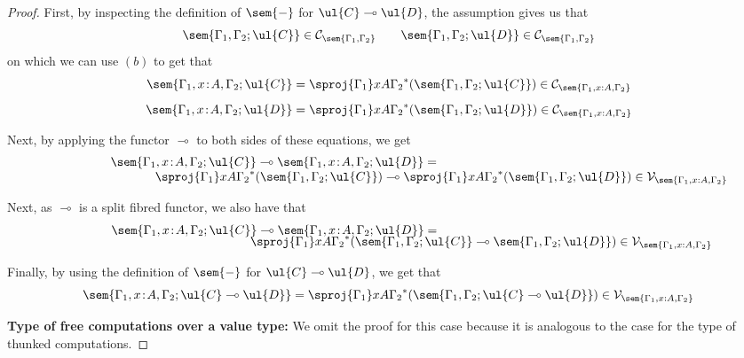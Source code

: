 \begin{proof}
First, by inspecting the definition of $\sem{-}$ for $\ul{C} \multimap \ul{D}$, the assumption gives us that
\[
\sem{\Gamma_1,\Gamma_2;\ul{C}} \in \mathcal{C}_{\sem{\Gamma_1,\Gamma_2}}
\qquad
\sem{\Gamma_1,\Gamma_2;\ul{D}} \in \mathcal{C}_{\sem{\Gamma_1,\Gamma_2}}
\]
on which we can use $(b)$ to get that
\[
\begin{array}{c}
\sem{\Gamma_1, x \!:\! A, \Gamma_2; \ul{C}} = \sproj {\Gamma_1} x A {\Gamma_2}^*(\sem{\Gamma_1,\Gamma_2;\ul{C}}) \in \mathcal{C}_{\sem{\Gamma_1, x : A,\Gamma_2}}
\\[3mm]
\sem{\Gamma_1, x \!:\! A, \Gamma_2; \ul{D}} = \sproj {\Gamma_1} x A {\Gamma_2}^*(\sem{\Gamma_1,\Gamma_2;\ul{D}}) \in \mathcal{C}_{\sem{\Gamma_1, x : A,\Gamma_2}}
\end{array}
\]

Next, by applying the functor $\multimap$ to both sides of these equations, we get 
\[
\begin{array}{c}
\hspace{-6.5cm}
\sem{\Gamma_1, x \!:\! A, \Gamma_2; \ul{C}} \multimap \sem{\Gamma_1, x \!:\! A, \Gamma_2; \ul{D}} = 
\\
\hspace{3cm}
\sproj {\Gamma_1} x A {\Gamma_2}^*(\sem{\Gamma_1,\Gamma_2;\ul{C}}) \multimap \sproj {\Gamma_1} x A {\Gamma_2}^*(\sem{\Gamma_1,\Gamma_2;\ul{D}}) \in \mathcal{V}_{\sem{\Gamma_1, x : A,\Gamma_2}}
\end{array}
\]

Next, as $\multimap$ is a split fibred functor, we also have that
\[
\begin{array}{c}
\hspace{-6.5cm}
\sem{\Gamma_1, x \!:\! A, \Gamma_2; \ul{C}} \multimap \sem{\Gamma_1, x \!:\! A, \Gamma_2; \ul{D}} = 
\\[-1mm]
\hspace{5.25cm}
\sproj {\Gamma_1} x A {\Gamma_2}^*(\sem{\Gamma_1,\Gamma_2;\ul{C}} \multimap \sem{\Gamma_1,\Gamma_2;\ul{D}}) \in \mathcal{V}_{\sem{\Gamma_1, x : A,\Gamma_2}}
\end{array}
\]

Finally, by using the definition of $\sem{-}$ for $\ul{C} \multimap \ul{D}$, we get that
\[
\sem{\Gamma_1, x \!:\! A, \Gamma_2; \ul{C} \multimap \ul{D}} = \sproj {\Gamma_1} x A {\Gamma_2}^*(\sem{\Gamma_1,\Gamma_2;\ul{C} \multimap \ul{D}}) \in \mathcal{V}_{\sem{\Gamma_1, x : A,\Gamma_2}}
\]

\vspace{0.2cm}
\noindent
\textbf{Type of free computations over a value type:}
We omit the proof for this case because it is analogous to the case for the type of thunked computations. 


\end{proof}
